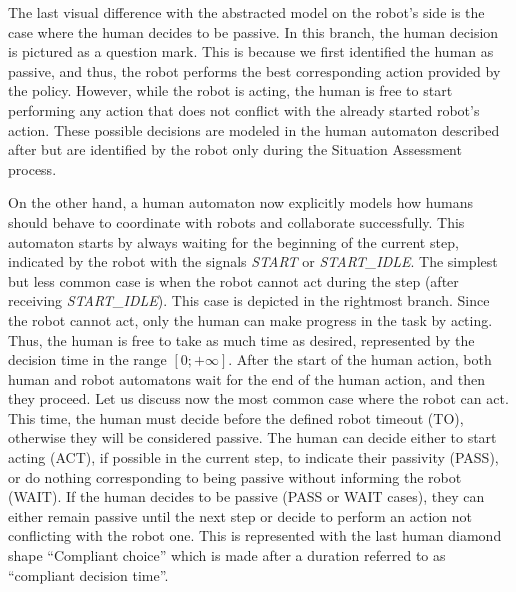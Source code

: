 
The last visual difference with the abstracted model on the robot's side is the case where the human decides to be passive. In this branch, the human decision is pictured as a question mark. This is because we first identified the human as passive, and thus, the robot performs the best corresponding action provided by the policy. However, while the robot is acting, the human is free to start performing any action that does not conflict with the already started robot's action. These possible decisions are modeled in the human automaton described after but are identified by the robot only during the Situation Assessment process. 

On the other hand, a human automaton now explicitly models how humans should behave to coordinate with robots and collaborate successfully. This automaton starts by always waiting for the beginning of the current step, indicated by the robot with the signals \textit{START} or \textit{START\_IDLE}. The simplest but less common case is when the robot cannot act during the step (after receiving \textit{START\_IDLE}). This case is depicted in the rightmost branch. Since the robot cannot act, only the human can make progress in the task by acting. Thus, the human is free to take as much time as desired, represented by the decision time in the range $[0; +\infty]$. After the start of the human action, both human and robot automatons wait for the end of the human action, and then they proceed.
Let us discuss now the most common case where the robot can act. This time, the human must decide before the defined robot timeout (TO), otherwise they will be considered passive. The human can decide either to start acting (ACT), if possible in the current step, to indicate their passivity (PASS), or do nothing corresponding to being passive without informing the robot (WAIT). If the human decides to be passive (PASS or WAIT cases), they can either remain passive until the next step or decide to perform an action not conflicting with the robot one. This is represented with the last human diamond shape ``Compliant choice'' which is made after a duration referred to as ``compliant decision time''.


